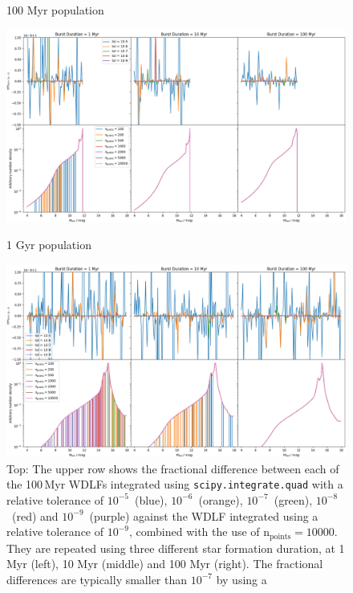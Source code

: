 \documentclass[fleqn,usenatbib]{mnras}
\begin{document}
\begin{figure}
    \centering
    \begin{large}
        100 Myr population
    \end{large}
    \includegraphics[width=1.0\linewidth]{figures/fig_A_age_1000000000.png} \\
    \begin{large}
        1 Gyr population 
    \end{large}
    \includegraphics[width=1.0\linewidth]{figures/fig_A_age_10000000000.png}
    \caption{Top: The upper row shows the fractional difference between each of
    the 100\,Myr WDLFs integrated using \texttt{scipy.integrate.quad} with a
    relative tolerance of $10^{-5}$~(blue), $10^{-6}$~(orange),
    $10^{-7}$~(green), $10^{-8}$~(red) and $10^{-9}$~(purple) against the WDLF
    integrated using a relative tolerance of $10^{-9}$, combined with the use
    of n$_{\mathrm{points}}=10000$. They are repeated using three different
    star formation duration, at 1 Myr (left), 10 Myr (middle) and 100 Myr (right).
    The fractional differences are typically smaller than $10^{-7}$ by using a
}
\end{figure}
\end{document}
